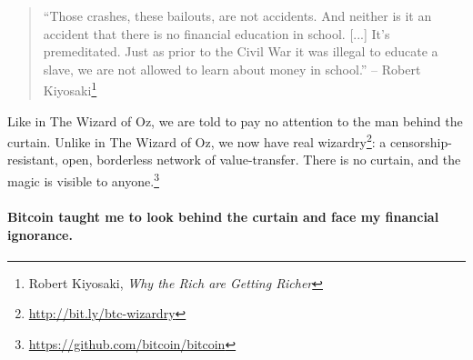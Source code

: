 \begin{quotation}\begin{samepage}
\enquote{Those crashes, these bailouts, are not accidents. And neither is it an
accident that there is no financial education in school. [...] It's
premeditated. Just as prior to the Civil War it was illegal to educate a slave,
we are not allowed to learn about money in school.}
\flushright -- Robert Kiyosaki\footnote{Robert Kiyosaki, \textit{Why the Rich
are Getting Richer}\cite{robert-kiyosaki}}
\end{samepage}\end{quotation}

Like in The Wizard of Oz, we are told to pay no attention to the man behind the
curtain. Unlike in The Wizard of Oz, we now have real
wizardry\footnote{\url{http://bit.ly/btc-wizardry}}: a censorship-resistant,
open, borderless network of value-transfer. There is no curtain, and the magic
is visible to anyone.\footnote{\url{https://github.com/bitcoin/bitcoin}}

\paragraph{Bitcoin taught me to look behind the curtain and face my financial
ignorance.}

%
%
%
%
